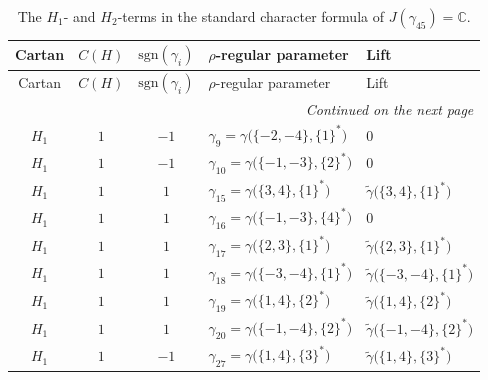 \documentclass{amsart}
\newcommand{\bbC}{{\mathbb{C}}}
\newcommand{\sgn}{{\mathrm{sgn}}}
\theoremstyle{definition}
\newcommand{\tu}{\widetilde}
\begin{document}
\begin{longtable}{
@{}
c
c
c
>{\raggedright\arraybackslash}p{}
>{\raggedright\arraybackslash}p{}
@{}
}
\caption{The \(H_1\)- and \(H_2\)-terms in the standard character formula
of \(J(\gamma_{45})=\bbC\).}
\label{tab:Spin53-H1-H2}
\\
\toprule
Cartan
&
\(C(H)\)
&
\(\sgn(\gamma_i)\)
&
\(\rho\)-regular parameter
&
Lift
\\
\midrule
\endfirsthead

\toprule
Cartan
&
\(C(H)\)
&
\(\sgn(\gamma_i)\)
&
\(\rho\)-regular parameter
&
Lift
\\
\midrule
\endhead

\midrule
\multicolumn{5}{r}{\textit{Continued on the next page}}
\\
\endfoot

\bottomrule
\endlastfoot

\(H_1\)
&
\(1\)
&
\(-1\)
&
\(\gamma_9=\gamma\bigl(\{-2,-4\},\{1\}^*\bigr)\)
&
\(0\)
\\

\(H_1\)
&
\(1\)
&
\(-1\)
&
\(\gamma_{10}=\gamma\bigl(\{-1,-3\},\{2\}^*\bigr)\)
&
\(0\)
\\
\addlinespace

\(H_1\)
&
\(1\)
&
\(1\)
&
\(\gamma_{15}=\gamma\bigl(\{3,4\},\{1\}^*\bigr)\)
&
\(\tu\gamma\bigl(\{3,4\},\{1\}^*\bigr)\)
\\

\(H_1\)
&
\(1\)
&
\(1\)
&
\(\gamma_{16}=\gamma\bigl(\{-1,-3\},\{4\}^*\bigr)\)
&
\(0\)
\\

\(H_1\)
&
\(1\)
&
\(1\)
&
\(\gamma_{17}=\gamma\bigl(\{2,3\},\{1\}^*\bigr)\)
&
\(\tu\gamma\bigl(\{2,3\},\{1\}^*\bigr)\)
\\

\(H_1\)
&
\(1\)
&
\(1\)
&
\(\gamma_{18}=\gamma\bigl(\{-3,-4\},\{1\}^*\bigr)\)
&
\(\tu\gamma\bigl(\{-3,-4\},\{1\}^*\bigr)\)
\\

\(H_1\)
&
\(1\)
&
\(1\)
&
\(\gamma_{19}=\gamma\bigl(\{1,4\},\{2\}^*\bigr)\)
&
\(\tu\gamma\bigl(\{1,4\},\{2\}^*\bigr)\)
\\

\(H_1\)
&
\(1\)
&
\(1\)
&
\(\gamma_{20}=\gamma\bigl(\{-1,-4\},\{2\}^*\bigr)\)
&
\(\tu\gamma\bigl(\{-1,-4\},\{2\}^*\bigr)\)
\\
\addlinespace

\(H_1\)
&
\(1\)
&
\(-1\)
&
\(\gamma_{27}=\gamma\bigl(\{1,4\},\{3\}^*\bigr)\)
&
\(\tu\gamma\bigl(\{1,4\},\{3\}^*\bigr)\)
\\


\end{longtable}
\end{document}
